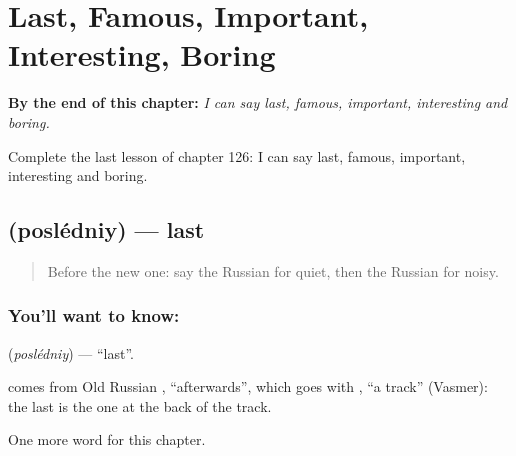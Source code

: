 
\chapter{Last, Famous, Important, Interesting, Boring}
\label{ch:ru-last-famous-important-interesting-boring}

\begin{chapteropening}
\textbf{By the end of this chapter:} \emph{I can say last, famous, important, interesting and boring.}

Complete the last lesson of chapter 126: I can say last, famous, important, interesting and boring.
\end{chapteropening}

\section[\texorpdfstring{\ru{последний} (poslédniy)}{последний (poslédniy)}]{ (poslédniy) — last}

\label{lesson:RU-C126-last}



\begin{quote}
Before the new one: say the Russian for quiet, then the Russian for noisy.
\end{quote}

\subsection*{You'll want to know: }
\textbf{} (\emph{poslédniy}) — \textquotedblleft{}last\textquotedblright{}.

\begin{cousinweb}
\textbf{} comes from Old Russian \emph{}, \textquotedblleft{}afterwards\textquotedblright{}, which goes with \emph{}, \textquotedblleft{}a track\textquotedblright{} (Vasmer): the last is the one at the back of the track.
\end{cousinweb}

\begin{grammarlens}[title={What you've built}]
One more word for this chapter.
\end{grammarlens}

